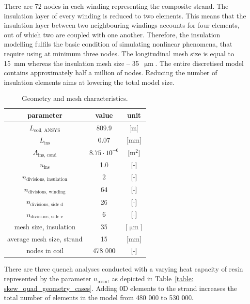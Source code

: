 There are 72 nodes in each winding representing the composite strand. The insulation layer of every winding is reduced to two elements. This means that the insulation layer between two neighbouring windings accounts for four elements, out of which two are coupled with one another. Therefore, the insulation modelling fulfils the basic condition of simulating nonlinear phenomena, that require using at minimum three nodes. The longitudinal mesh size is equal to 15~mm whereas the insulation mesh size -- 35~$\upmu \text{m}$. The entire discretised model contains approximately half a million of nodes. Reducing the number of insulation elements aims at lowering the total model size.

\begin{table}[H]
    \caption{Geometry and mesh characteristics.} 
    \vspace{-1.em} 
    \fontsize{10}{10}
    \selectfont 
    \renewcommand{\arraystretch}{1.5}
    \begin{center}
        \begin{tabular}{ ccc }  
        \hline
        parameter & value & unit \\
        \hline
        $L_\text{coil, ANSYS}$ & 809.9 & [m] \\
        $L_\text{ins}$ & 0.07 & [mm] \\
        $A_\text{ins, cond}$ & $8.75 \cdot 10^{-6}$ & [$\text{m}^2$] \\
        $u_\text{ins}$ & 1.0 & [-] \\
        $n_\text{divisions, insulation}$ & 2 & [-] \\
        $n_\text{divisions, winding}$ & 64 & [-] \\
        $n_\text{divisions, side d}$ & 26 & [-] \\
        $n_\text{divisions, side e}$ & 6 & [-] \\
        mesh size, insulation & 35 & [$\upmu \text{m}$] \\
        average mesh size, strand & 15 & [mm] \\ 
        nodes in coil & 478 000 & [-] \\
        \hline 
        \end{tabular}
    \end{center}  
     \label{table: skew_quad_geometry_mesh} 
 \end{table}

There are three quench analyses conducted with a varying heat capacity of resin represented by the parameter $u_\text{resin}$, as depicted in Table~\ref{table: skew_quad_geometry_cases}. Adding 0D elements to the strand increases the total number of elements in the model from 480 000 to 530 000. 

